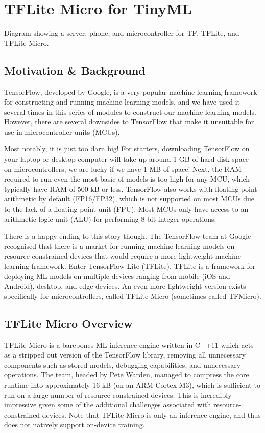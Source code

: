 {{{{{  
\section{TFLite Micro for TinyML}



Diagram showing a server, phone, and microcontroller for TF, TFLite, and TFLite Micro.

\subsection{Motivation \& Background}

TensorFlow, developed by Google, is a very popular machine learning framework for constructing and running machine learning models, and we have used it several times in this series of modules to construct our machine learning models. However, there are several downsides to TensorFlow that make it unsuitable for use in microcontroller units (MCUs).

Most notably, it is just too darn big! For starters, downloading TensorFlow on your laptop or desktop computer will take up around 1 GB of hard disk space - on microcontrollers, we are lucky if we have 1 MB of space! Next, the RAM required to run even the most basic of models is too high for any MCU, which typically have RAM of 500 kB or less. TensorFlow also works with floating point arithmetic by default (FP16/FP32), which is not supported on most MCUs due to the lack of a floating point unit (FPU). Most MCUs only have access to an arithmetic logic unit (ALU) for performing 8-bit integer operations.

There is a happy ending to this story though. The TensorFlow team at Google recognised that there is a market for running machine learning models on resource-constrained devices that would require a more lightweight machine learning framework. Enter TensorFlow Lite (TFLite). TFLite is a framework for deploying ML models on multiple devices ranging from mobile (iOS and Android), desktop, and edge devices. An even more lightweight version exists specifically for microcontrollers, called TFLite Micro (sometimes called TFMicro).

\subsection{TFLite Micro Overview}

TFLite Micro is a barebones ML inference engine written in C++11 which acts as a stripped out version of the TensorFlow library, removing all unnecessary components such as stored models, debugging capabilities, and unnecessary operations. The team, headed by Pete Warden, managed to compress the core runtime into approximately 16 kB (on an ARM Cortex M3), which is sufficient to run on a large number of resource-constrained devices. This is incredibly impressive given some of the additional challenges associated with resource-constrained devices. Note that TFLite Micro is only an inference engine, and thus does not natively support on-device training.

}}}}}
